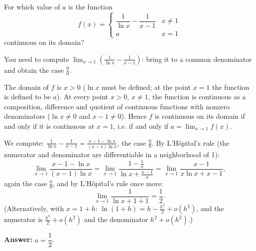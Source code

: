 
\begin{question}
For which value of $a$ is the function
\[ f(x)=\begin{cases} \dfrac{1}{\ln x}-\dfrac{1}{x-1} & x\neq 1\\[2mm] a & x=1\end{cases} \]
continuous on its domain?
\end{question}

\begin{hint}
You need to compute $\lim_{x\to1}\left(\frac{1}{\ln x}-\frac{1}{x-1}\right)$: bring it to a common denominator and obtain the case $\frac00$.
\end{hint}

\begin{solution}
The domain of $f$ is $x>0$ ($\ln x$ must be defined; at the point $x=1$ the function is defined to be $a$). At every point $x>0$, $x\ne1$, the function is continuous as a composition, difference and quotient of continuous functions with nonzero denominators ($\ln x\ne0$ and $x-1\ne0$). Hence $f$ is continuous on its domain if and only if it is continuous at $x=1$, i.e. if and only if $a=\lim_{x\to1}f(x)$.

We compute: $\displaystyle \frac{1}{\ln x}-\frac{1}{x-1} = \frac{x-1-\ln x}{(x-1)\ln x}$, the case $\frac{0}{0}$. By L'Hôpital's rule (the numerator and denominator are differentiable in a neighborhood of 1):
\[ \lim_{x\to1}\frac{x-1-\ln x}{(x-1)\ln x} = \lim_{x\to1}\frac{1-\frac1x}{\ln x+\frac{x-1}{x}} = \lim_{x\to1}\frac{x-1}{x\ln x + x-1}, \]
again the case $\frac00$, and by L'Hôpital's rule once more:
\[ \lim_{x\to1}\frac{1}{\ln x + 1 + 1} = \frac{1}{2}. \]
(Alternatively, with $x=1+h$: $\ln(1+h)=h-\frac{h^2}{2}+o(h^2)$, and the numerator is $\frac{h^2}{2}+o(h^2)$ and the denominator $h^2+o(h^2)$.)

\textbf{Answer:} $a=\dfrac12$.
\end{solution}
